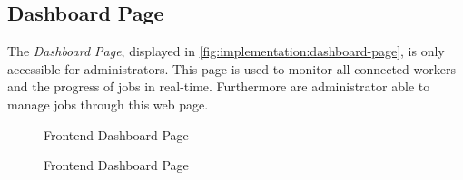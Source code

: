 \subsection{Dashboard Page}
\label{subsec:implementation:dashboard-page}
The \emph{Dashboard Page}, displayed in \autoref{fig:implementation:dashboard-page}, is only accessible for administrators. This page is used to monitor all connected workers and the progress of jobs in real-time. Furthermore are administrator able to manage jobs through this web page.
\begin{figure}[htbp]
    \myfloatalign
    \caption{Frontend Dashboard Page}
    \label{fig:implementation:dashboard-page}
\end{figure}
\begin{figure}[htbp] \ContinuedFloat
    \myfloatalign
    \caption{Frontend Dashboard Page}
    \label{fig:implementation:dashboard-page}
\end{figure}
